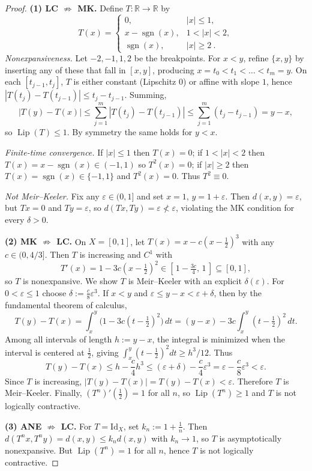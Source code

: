 \documentclass[10pt,a4paper]{amsart}
\DeclareMathOperator{\Lip}{Lip}
\DeclareMathOperator{\sgn}{sgn}
\begin{document}
\begin{proof}
\textbf{(1) LC $\not\Rightarrow$ MK.} Define $T:\mathbb{R}\to\mathbb{R}$ by
\[
T(x)=
\begin{cases}
0, & |x|\le 1,\\[3pt]
x-\sgn(x), & 1<|x|<2,\\[3pt]
\sgn(x), & |x|\ge 2~.
\end{cases}
\]
\emph{Nonexpansiveness.} Let $-2,-1,1,2$ be the breakpoints. For $x<y$, refine $\{x,y\}$ by inserting any of these that fall in $[x,y]$, producing $x=t_0<t_1<\dots<t_m=y$. On each $[t_{j-1},t_j]$, $T$ is either constant (Lipschitz $0$) or affine with slope $1$, hence $|T(t_j)-T(t_{j-1})|\le t_j-t_{j-1}$. Summing,
\[
|T(y)-T(x)| \le \sum_{j=1}^m |T(t_j)-T(t_{j-1})|
\le \sum_{j=1}^m (t_j-t_{j-1}) = y-x,
\]
so $\Lip(T)\le 1$. By symmetry the same holds for $y<x$.

\emph{Finite-time convergence.} If $|x|\le 1$ then $T(x)=0$; if $1<|x|<2$ then $T(x)=x-\sgn(x)\in(-1,1)$ so $T^2(x)=0$; if $|x|\ge 2$ then $T(x)=\sgn(x)\in\{-1,1\}$ and $T^2(x)=0$. Thus $T^2\equiv 0$.

\emph{Not Meir--Keeler.} Fix any $\varepsilon\in(0,1]$ and set $x=1$, $y=1+\varepsilon$. Then $d(x,y)=\varepsilon$, but $Tx=0$ and $Ty=\varepsilon$, so $d(Tx,Ty)=\varepsilon\not<\varepsilon$, violating the MK condition for every $\delta>0$.

\smallskip
\textbf{(2) MK $\not\Rightarrow$ LC.} On $X=[0,1]$, let $T(x)=x-c\!\left(x-\tfrac12\right)^3$ with any $c\in (0,4/3]$. Then $T$ is increasing and $C^1$ with
\[
T'(x)=1-3c\!\left(x-\tfrac12\right)^2 \in [\,1- \tfrac{3c}{4},\,1\,]\subseteq[0,1],
\]
so $T$ is nonexpansive. We show $T$ is Meir--Keeler with an explicit $\delta(\varepsilon)$. For $0<\varepsilon\le 1$ choose $\delta:=\tfrac{c}{8}\varepsilon^3$. If $x<y$ and $\varepsilon\le y-x<\varepsilon+\delta$, then by the fundamental theorem of calculus,
\[
T(y)-T(x)=\int_x^y \Big(1-3c(t-\tfrac12)^2\Big)\,dt
= (y-x) - 3c\!\int_x^y (t-\tfrac12)^2\,dt.
\]
Among all intervals of length $h:=y-x$, the integral is minimized when the interval is centered at $\tfrac12$, giving $\int_x^y (t-\tfrac12)^2 dt \ge h^3/12$. Thus
\[
T(y)-T(x) \le h - \frac{c}{4}h^3 \le (\varepsilon+\delta)-\frac{c}{4}\varepsilon^3
= \varepsilon - \frac{c}{8}\varepsilon^3 < \varepsilon.
\]
Since $T$ is increasing, $|T(y)-T(x)|=T(y)-T(x)<\varepsilon$. Therefore $T$ is Meir--Keeler. Finally, $(T^n)'(\tfrac12)=1$ for all $n$, so $\Lip(T^n)\ge 1$ and $T$ is not logically contractive.

\smallskip
\textbf{(3) ANE $\not\Rightarrow$ LC.} For $T=\mathrm{Id}_X$, set $k_n:=1+\tfrac1n$. Then $d(T^n x,T^n y)=d(x,y)\le k_n d(x,y)$ with $k_n\to 1$, so $T$ is asymptotically nonexpansive. But $\Lip(T^n)=1$ for all $n$, hence $T$ is not logically contractive.
\end{proof}
\end{document}
